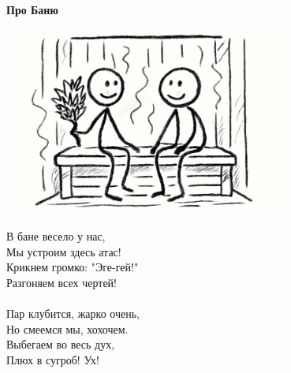 \vspace*{\fill}
\begin{center}
  {\huge\textbf{Про Баню}}

  \vspace{1.5em}  \includegraphics[width=0.7\textwidth]{pictures/bathhouse.png}
  \vspace{4em}
  \parbox{0.6\textwidth}{
    \LARGE
    \begin{spacing}{1.2}
      В бане весело у нас,\\
      Мы устроим здесь атас!\\
      Крикнем громко: "Эге-гей!"\\
      Разгоняем всех чертей!\\
      \\
      Пар клубится, жарко очень,\\
      Но смеемся мы, хохочем.\\
      Выбегаем во весь дух,\\
      Плюх в сугроб! Ух! %
    \end{spacing}
      
  }
\end{center}
\vspace*{\fill}